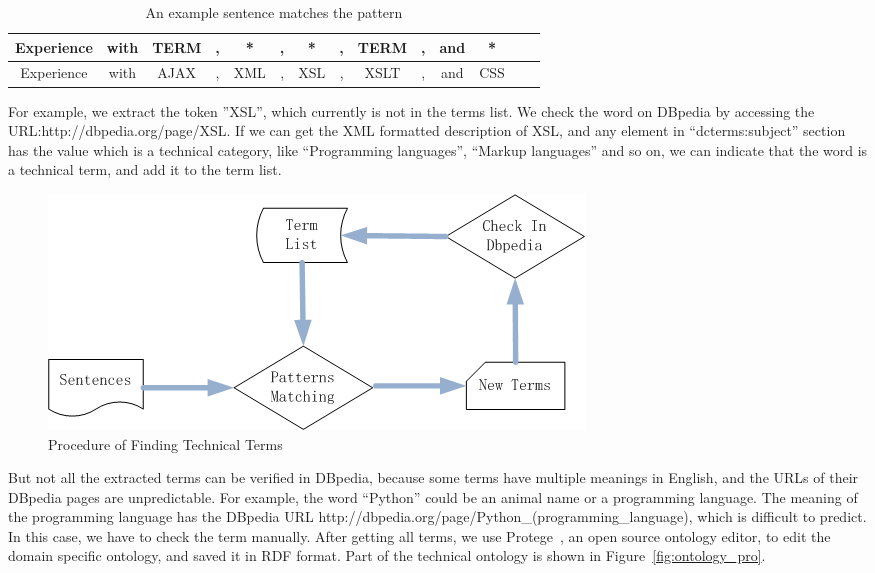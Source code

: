 \begin{table}[ht]
\caption{An example sentence matches the pattern} %
\centering %
\begin{tabular}{   | c | c | c | c |c | c |c | c |c | c |c | c |c | c |  }
 \hline
     Experience & with & TERM & , & *   & , & *   &, & TERM &, & and & *  \\
 \hline
     Experience & with & AJAX & , & XML & , & XSL &, & XSLT &, & and & CSS  \\
 \hline
\end{tabular}
\label{tab:termspattern} %
\end{table}

For example, we extract the token  ''XSL'', which currently is not in the terms list. We check the word on DBpedia by accessing the URL:http://dbpedia.org/page/XSL. If we can get the XML formatted description of XSL, and any element in ``dcterms:subject'' section has the value which is a technical category,  like ``Programming languages'', ``Markup languages'' and so on, we can indicate that the word is a technical term, and add it to the term list.

\begin{figure}[htbp]
  \includegraphics[scale=0.4]{images/genonto.png}
  \caption{Procedure of Finding Technical Terms}
  \label{fig:gen_onto}
\end{figure}

But not all the extracted terms can be verified in DBpedia, because some terms have multiple meanings in English, and the URLs of their DBpedia pages are unpredictable. For example, the word ``Python'' could be an animal name or a programming language.  The meaning of the programming language  has the DBpedia URL http://dbpedia.org/page/Python\_(programming\_language), which is difficult to predict. In this case, we have to check the term manually.  After getting all terms, we use Protege~\cite{noy2001creating}, an open source ontology editor, to edit the domain specific ontology, and saved it in RDF format. Part of the technical ontology is shown in Figure~\ref{fig:ontology_pro}.


